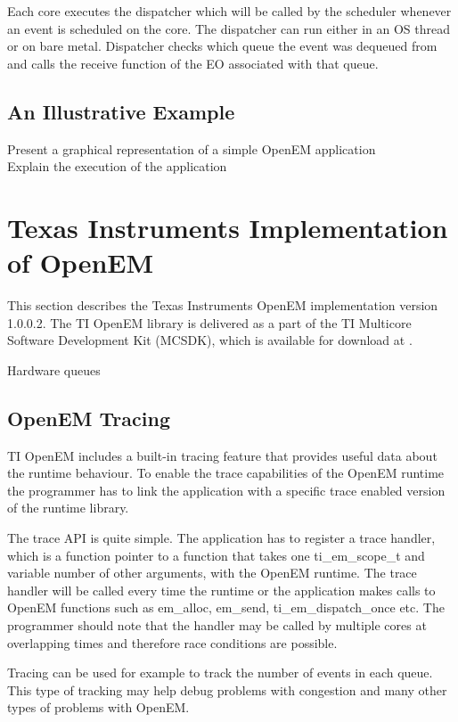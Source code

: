 Each core executes the dispatcher which will be called by the scheduler
whenever an event is scheduled on the core. The dispatcher can run either in an
OS thread or on bare metal. Dispatcher checks which queue the event was
dequeued from and calls the receive function of the EO associated with that
queue. \cite{openemintro}

\subsection{An Illustrative Example}
\label{subsec:example}
Present a graphical representation of a simple OpenEM application\\
Explain the execution of the application

\section{Texas Instruments Implementation of OpenEM}
\label{sec:tiopenem}
This section describes the Texas Instruments OpenEM implementation version
1.0.0.2. The TI OpenEM library is delivered as a part of the TI Multicore
Software Development Kit (MCSDK), which is available for download at
\cite{mcsdkdown}.

Hardware queues\\

\subsection{OpenEM Tracing}
TI OpenEM includes a built-in tracing feature that provides useful data about
the runtime behaviour. To enable the trace capabilities of the OpenEM runtime the
programmer has to link the application with a specific trace enabled version of
the runtime library. \cite{openemapi}

The trace API is quite simple. The application has to register a trace handler,
which is a function pointer to a function that takes one ti\_em\_scope\_t and
variable number of other arguments, with the OpenEM runtime. The trace handler
will be called every time the runtime or the application makes calls to OpenEM
functions such as em\_alloc, em\_send, ti\_em\_dispatch\_once etc.
\cite{openemapi} The programmer should note that the handler may be called by
multiple cores at overlapping times and therefore race conditions are possible.

Tracing can be used for example to track the number of events in each queue.
This type of tracking may help debug problems with congestion and many other
types of problems with OpenEM.

